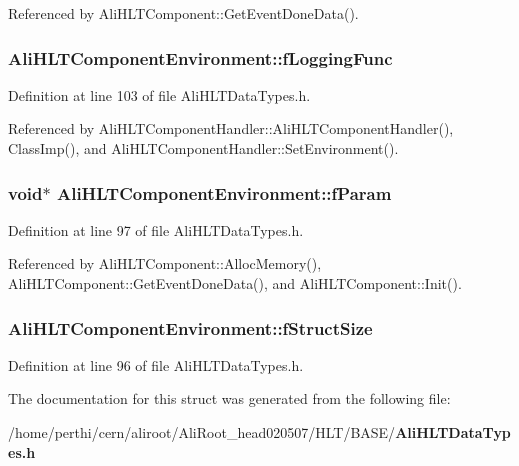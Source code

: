 Referenced by Ali\-HLTComponent::Get\-Event\-Done\-Data().
\subsubsection{ {\bf Ali\-HLTComponent\-Environment::f\-Logging\-Func}}\label{structAliHLTComponentEnvironment_o4}




Definition at line 103 of file Ali\-HLTData\-Types.h.

Referenced by Ali\-HLTComponent\-Handler::Ali\-HLTComponent\-Handler(), Class\-Imp(), and Ali\-HLTComponent\-Handler::Set\-Environment().
\subsubsection{\setlength{\rightskip}{0pt plus 5cm}void$\ast$ {\bf Ali\-HLTComponent\-Environment::f\-Param}}\label{structAliHLTComponentEnvironment_o1}




Definition at line 97 of file Ali\-HLTData\-Types.h.

Referenced by Ali\-HLTComponent::Alloc\-Memory(), Ali\-HLTComponent::Get\-Event\-Done\-Data(), and Ali\-HLTComponent::Init().
\subsubsection{ {\bf Ali\-HLTComponent\-Environment::f\-Struct\-Size}}\label{structAliHLTComponentEnvironment_o0}




Definition at line 96 of file Ali\-HLTData\-Types.h.

The documentation for this struct was generated from the following file:\begin{CompactItemize}
\item 
/home/perthi/cern/aliroot/Ali\-Root\_\-head020507/HLT/BASE/{\bf Ali\-HLTData\-Types.h}\end{CompactItemize}
